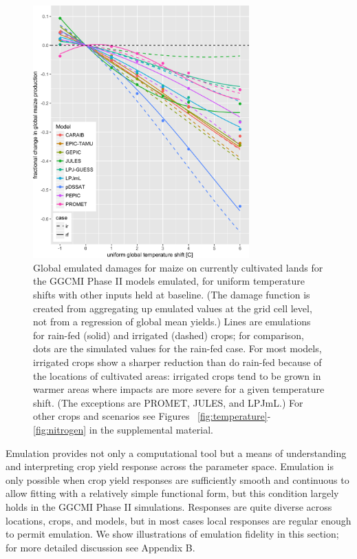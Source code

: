 \documentclass[esd, final]{copernicus} %
\begin{document}
\begin{figure}[h]
    \centering
    \includegraphics[width=8.3cm]{figures/global_em_maize.png}
    \caption{Global emulated damages for maize on currently cultivated lands for the GGCMI Phase II models emulated, for uniform temperature shifts with other inputs held at baseline. (The damage function is created from aggregating up emulated values at the grid cell level, not from a regression of global mean yields.) Lines are emulations for rain-fed (solid) and irrigated (dashed) crops; for comparison, dots are the simulated values for the rain-fed case.  For most models, irrigated crops show a sharper reduction than do rain-fed because of the locations of cultivated areas: irrigated crops tend to be grown in warmer areas where impacts are more severe for a given temperature shift. (The exceptions are PROMET, JULES, and LPJmL.) For other crops and scenarios see Figures ~\ref{fig:temperature}- \ref{fig:nitrogen} in the supplemental material.}
    \label{fig:globe_em}
\end{figure}

Emulation provides not only a computational tool but a means of understanding and interpreting crop yield response across the parameter space. Emulation is only possible  when crop yield responses are sufficiently smooth and continuous to allow fitting with a relatively simple functional form, but this condition largely holds in the GGCMI Phase II simulations. Responses are quite diverse across locations, crops, and models, but in most cases local responses are regular enough to permit emulation. We show illustrations of emulation fidelity in this section; for more detailed discussion see Appendix B.
\end{document}
